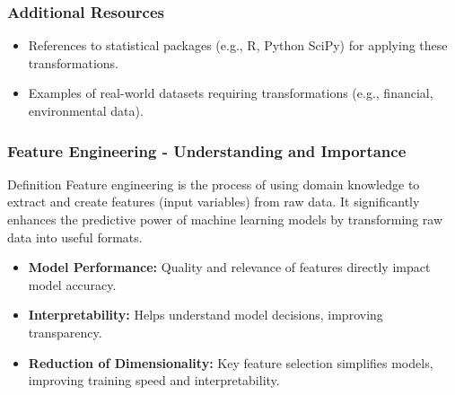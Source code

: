 \documentclass[aspectratio=169]{beamer}
\begin{document}
\begin{frame}[fragile]
    \frametitle{Additional Resources}
    \begin{itemize}
        \item References to statistical packages (e.g., R, Python SciPy) for applying these transformations.
        \item Examples of real-world datasets requiring transformations (e.g., financial, environmental data).
    \end{itemize}
\end{frame}

\begin{frame}[fragile]
    \frametitle{Feature Engineering - Understanding and Importance}
    \begin{block}{Definition}
        Feature engineering is the process of using domain knowledge to extract and create features (input variables) from raw data. It significantly enhances the predictive power of machine learning models by transforming raw data into useful formats.
    \end{block}
    \begin{itemize}
        \item \textbf{Model Performance:} Quality and relevance of features directly impact model accuracy.
        \item \textbf{Interpretability:} Helps understand model decisions, improving transparency.
        \item \textbf{Reduction of Dimensionality:} Key feature selection simplifies models, improving training speed and interpretability.
    \end{itemize}
\end{frame}
\end{document}
